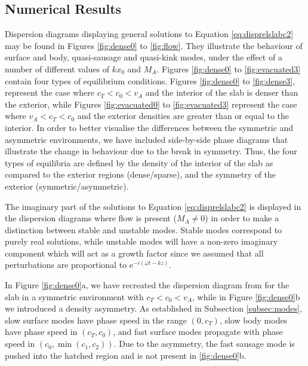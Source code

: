 \documentclass[12pt]{ociamthesis}
\begin{document}
\subsection{Numerical Results}
\label{subsec:numresults}

Dispersion diagrams displaying general solutions to Equation \eqref{eq:disprelslabc2} may be found in Figures \ref{fig:dense0} to \ref{fig:flow}.
They illustrate the behaviour of surface and body, quasi-sausage and quasi-kink modes, under the effect of a number of different values of $k x_0$ and $M_A$.
Figures \ref{fig:dense0} to \ref{fig:evacuated3} contain four types of equilibrium conditions.
Figures \ref{fig:dense0} to \ref{fig:dense3}, represent the case where $c_T < c_0 < v_A$ and the interior of the slab is denser than the exterior, while Figures \ref{fig:evacuated0} to \ref{fig:evacuated3} represent the case where $v_A < c_T < c_0$ and the exterior densities are greater than or equal to the interior.
In order to better visualise the differences between the symmetric and asymmetric environments, we have included side-by-side phase diagrams that illustrate the change in behaviour due to the break in symmetry.
Thus, the four types of equilibria are defined by the density of the interior of the slab as compared to the exterior regions (dense/sparse), and the symmetry of the exterior (symmetric/asymmetric).

The imaginary part of the solutions to Equation \eqref{eq:disprelslabc2} is displayed in the dispersion diagrams where flow is present ($M_A \neq 0$) in order to make a distinction between stable and unstable modes.
Stable modes correspond to purely real solutions, while unstable modes will have a non-zero imaginary component which will act as a growth factor since we assumed that all perturbations are proportional to $\mathrm{e}^{-i (\omega t - k z)}$.

In Figure \ref{fig:dense0}a, we have recreated the dispersion diagram from \cite{Roberts1981b} for the slab in a symmetric environment with $c_T < c_0 < v_A$, while in Figure \ref{fig:dense0}b we introduced a density asymmetry.
As established in Subsection \ref{subsec:modes}, slow surface modes have phase speed in the range $(0, c_T)$, slow body modes have phase speed in $(c_T, c_0)$, and fast surface modes propagate with phase speed in $(c_0, \min(c_1, c_2))$.
Due to the asymmetry, the fast sausage mode is pushed into the hatched region and is not present in \ref{fig:dense0}b.
\end{document}

